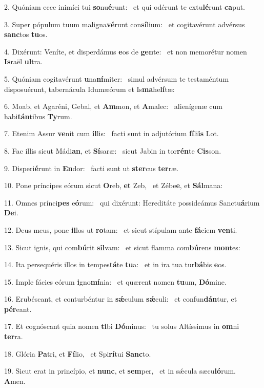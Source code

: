 2. Quóniam ecce inimíci tui \textbf{so}nu\textbf{é}runt: \ast\  et qui odérunt te extu\textbf{lé}runt \textbf{ca}put.\

3. Super pópulum tuum maligna\textbf{vé}runt con\textbf{sí}lium: \ast\  et cogitavérunt advérsus \textbf{sanc}tos \textbf{tu}os.\

4. Dixérunt: Veníte, et disperdámus \textbf{e}os de \textbf{gen}te: \ast\  et non memorétur nomen \textbf{Is}raël \textbf{ul}tra.\

5. Quóniam cogitavérunt \textbf{u}na\textbf{ní}miter: \ast\  simul advérsum te testaméntum disposuérunt, tabernácula Idumæórum et Is\textbf{ma}he\textbf{lí}tæ:\

6. Moab, et Agaréni, Gebal, et \textbf{Am}mon, et \textbf{A}malec: \ast\  alienígenæ cum habi\textbf{tán}tibus \textbf{Ty}rum.\

7. Etenim Assur \textbf{ve}nit cum \textbf{il}lis: \ast\  facti sunt in adjutórium \textbf{fí}li\textbf{is} Lot.\

8. Fac illis sicut Mádi\textbf{an}, et \textbf{Sí}saræ: \ast\  sicut Jabin in tor\textbf{rén}te \textbf{Cis}son.\

9. Disperi\textbf{é}runt in \textbf{En}dor: \ast\  facti sunt ut \textbf{ster}cus \textbf{ter}ræ.\

10. Pone príncipes eórum sicut \textbf{O}reb, \textbf{et} Zeb, \ast\  et Zébe\textbf{e}, et \textbf{Sál}mana:\

11. Omnes prínci\textbf{pes} e\textbf{ó}rum: \ast\  qui dixérunt: Hereditáte possideámus Sanctu\textbf{á}rium \textbf{De}i.\

12. Deus meus, pone \textbf{il}los ut \textbf{ro}tam: \ast\  et sicut stípulam ante \textbf{fá}ciem \textbf{ven}ti.\

13. Sicut ignis, qui com\textbf{bú}rit \textbf{sil}vam: \ast\  et sicut flamma com\textbf{bú}rens \textbf{mon}tes:\

14. Ita persequéris illos in tempes\textbf{tá}te \textbf{tu}a: \ast\  et in ira tua tur\textbf{bá}bis \textbf{e}os.\

15. Imple fácies eórum \textbf{i}gno\textbf{mí}nia: \ast\  et quærent nomen \textbf{tu}um, \textbf{Dó}mine.\

16. Erubéscant, et conturbéntur in \textbf{sǽ}culum \textbf{sǽ}culi: \ast\  et confun\textbf{dán}tur, et \textbf{pér}eant.\

17. Et cognóscant quia nomen \textbf{ti}bi \textbf{Dó}minus: \ast\  tu solus Altíssimus in \textbf{om}ni \textbf{ter}ra.\

18. Glória \textbf{Pa}tri, et \textbf{Fí}lio, \ast\  et Spi\textbf{rí}tui \textbf{Sanc}to.\

19. Sicut erat in princípio, et \textbf{nunc}, et \textbf{sem}per, \ast\  et in sǽcula sæcu\textbf{ló}rum. \textbf{A}men.\

